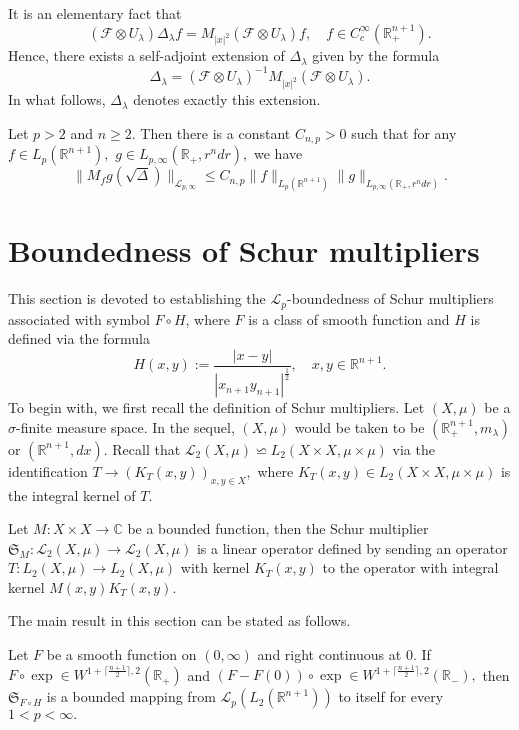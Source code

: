 \documentclass{amsart}
\begin{document}
It is an elementary fact that
$$(\mathcal{F}\otimes U_{\lambda})\Delta_{\lambda}f=M_{|x|^2}(\mathcal{F}\otimes U_{\lambda})f,\quad f\in C^{\infty}_c(\mathbb{R}_+^{n+1}).$$
Hence, there exists a self-adjoint extension of $\Delta_{\lambda}$ given by the formula
$$\Delta_{\lambda}=(\mathcal{F}\otimes U_{\lambda})^{-1}M_{|x|^2}(\mathcal{F}\otimes U_{\lambda}).$$
In what follows, $\Delta_{\lambda}$ denotes exactly this extension.



\begin{lemma}\cite[Theorem 4.2]{MR541149}\label{cwikel estimate in Euclidean setting}
Let $p>2$ and $n\geq 2.$ Then there is a constant $C_{n,p}>0$ such that for any $f\in L_p(\mathbb{R}^{n+1}),$ $g\in L_{p,\infty}(\mathbb{R}_+,r^ndr),$ we have
$$\|M_fg(\sqrt{\Delta})\|_{\mathcal{L}_{p,\infty}}\leq C_{n,p}\|f\|_{L_p(\mathbb{R}^{n+1})}\|g\|_{L_{p,\infty}(\mathbb{R}_+,r^ndr)}.$$
\end{lemma}


\section{Boundedness of Schur multipliers}
\setcounter{equation}{0}

This section is devoted to establishing the $\mathcal{L}_p$-boundedness of Schur multipliers associated with symbol $F\circ H$, where $F$ is a class of smooth function and $H$ is defined via the formula
$$H(x,y):=\frac{|x-y|}{|x_{n+1}y_{n+1}|^{\frac12}},\quad x,y\in\mathbb{R}^{n+1}.$$
To begin with, we first recall the definition of Schur multipliers. Let $(X,\mu)$ be a $\sigma$-finite measure space. In the sequel, $(X,\mu)$ would be taken to be $(\mathbb{R}_+^{n+1},m_\lambda)$ or $(\mathbb{R}^{n+1},dx)$. Recall that $\mathcal{L}_2(X,\mu)\backsimeq L_2(X\times X,\mu\times\mu)$ via the identification $T\rightarrow (K_T(x,y))_{x,y\in X},$ where $K_T(x,y)\in L_2(X\times X,\mu\times\mu)$ is the integral kernel of $T.$

\begin{definition}
Let $M:X\times X\rightarrow \mathbb{C}$ be a bounded function, then the Schur multiplier $\mathfrak{S}_M: \mathcal{L}_2(X,\mu)\rightarrow \mathcal{L}_2(X,\mu)$ is a linear operator defined by sending an operator $T:L_2(X,\mu)\rightarrow L_2(X,\mu)$ with kernel $K_T(x,y)$ to the operator with integral kernel $M(x,y)K_T(x,y).$
\end{definition}


The main result in this section can be stated as follows.
\begin{theorem}\label{main schur theorem} Let $F$ be a smooth function on $(0,\infty)$ and right continuous at $0.$ If $F\circ\exp\in W^{1+\lceil\frac{n+1}{2}\rceil,2}(\mathbb{R}_+)$ and $(F-F(0))\circ\exp\in W^{1+\lceil\frac{n+1}{2}\rceil,2}(\mathbb{R}_-),$ then $\mathfrak{S}_{F\circ H}$ is a bounded mapping from $\mathcal{L}_p(L_2(\mathbb{R}^{n+1}))$ to itself for every $1<p<\infty.$
\end{theorem}
\end{document}

